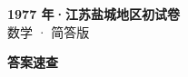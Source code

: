 \documentclass[zihao=-4, a4paper]{ctexart}
\begin{document}
\begin{center}
  {\Large\bfseries 1977 年·江苏盐城地区初试卷}\\[4pt]
  {\large 数学 · 简答版}
\end{center}
\medskip
{}

\clearpage
{}
\begin{center}{\Large\bfseries 答案速查}\end{center}
\medskip

\end{document}
